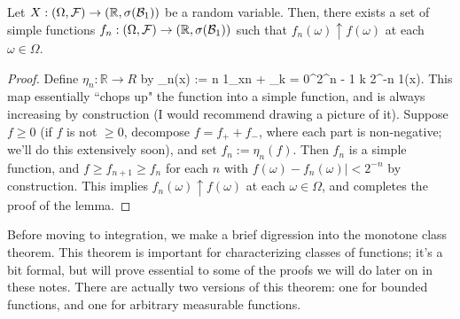 \begin{lemma}
	Let $X : (\Omega, \mathcal F)\rightarrow (\mathbb R, \sigma(\mathcal{B}_{1}))$ be a random variable. Then, there exists a set of simple functions $f_n : (\Omega, \mathcal F)\rightarrow (\mathbb R, \sigma(\mathcal{B}_{1}))$ such that $f_n(\omega)\uparrow f(\omega)$ at each $\omega\in\Omega$. 
\end{lemma}
\begin{proof}
	Define $\eta_n : \mathbb R\rightarrow R$ by 
	\eq
		\eta_n(x) := n 1_{x\geq n} + \sum_{k = 0}^{2^n - 1} k 2^{-n} 1(x).
	\qe
	This map essentially ``chops up" the function into a simple function, and is always increasing by construction (I would recommend drawing a picture of it). Suppose $f\geq 0$ (if $f$ is not $\geq 0$, decompose $f = f_+ + f_-$, where each part is non-negative; we'll do this extensively soon), and set $f_n := \eta_n(f)$. Then $f_n$ is a simple function, and $f\geq f_{n + 1}\geq f_n$ for each $n$ with $f(\omega) - f_n(\omega)| < 2^{-n}$ by construction. This implies $f_n(\omega)\uparrow f(\omega)$ at each $\omega\in\Omega$, and completes the proof of the lemma. 
\end{proof}

Before moving to integration, we make a brief digression into the monotone class theorem. This theorem is important for characterizing classes of functions; it's a bit formal, but will prove essential to some of the proofs we will do later on in these notes. There are actually two versions of this theorem: one for bounded functions, and one for arbitrary measurable functions. 

